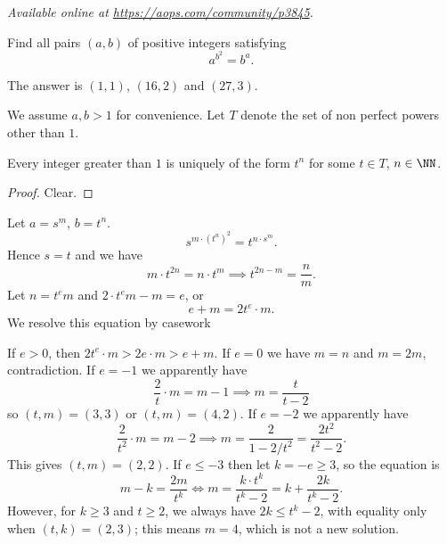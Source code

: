 \textsl{Available online at \url{https://aops.com/community/p3845}.}
\begin{mdframed}[style=mdpurplebox,frametitle={Problem statement}]
Find all pairs $(a,b)$ of positive integers satisfying
\[ a^{b^2} = b^a. \]
\end{mdframed}
The answer is $(1,1)$, $(16,2)$ and $(27,3)$.

We assume $a,b > 1$ for convenience.
Let $T$ denote the set of non perfect powers other than $1$.
\begin{claim*}
Every integer greater than $1$
is uniquely of the form $t^n$ for some $t \in T$, $n \in \NN$.
\end{claim*}
\begin{proof}
  Clear.
\end{proof}

Let $a = s^m$, $b = t^n$.
\[ s^{m \cdot (t^n)^2} = t^{n \cdot s^m}. \]
Hence $s = t$ and we have
\[ m \cdot t^{2n} = n \cdot t^m
  \implies t^{2n-m} = \frac nm. \]
Let $n = t^e m$ and $2 \cdot t^e m - m = e$, or
\[ e + m = 2t^e \cdot m. \]
We resolve this equation by casework
\begin{itemize}
  \ii If $e > 0$, then $2t^e \cdot m > 2e \cdot m > e+m$.
  \ii If $e=0$ we have $m=n$ and $m = 2m$, contradiction.
  \ii If $e = -1$ we apparently have
  \[ \frac{2}{t} \cdot m = m-1 \implies
    m = \frac{t}{t-2} \]
  so $(t,m) = (3,3)$ or $(t,m) = (4,2)$.
  \ii If $e = -2$ we apparently have
  \[ \frac{2}{t^2} \cdot m = m - 2
    \implies m = \frac{2}{1 - 2/t^2} = \frac{2t^2}{t^2-2}. \]
  This gives $(t,m) = (2,2)$.
  \ii If $e \le -3$ then let $k = -e \ge 3$, so the equation is
  \[ m-k = \frac{2m}{t^k}
  \iff m = \frac{k \cdot t^k}{t^k-2}
    = k + \frac{2k}{t^k-2}. \]
  However, for $k \ge 3$ and $t \ge 2$,
  we always have $2k \le t^k - 2$,
  with equality only when $(t,k) = (2,3)$;
  this means $m=4$, which is not a new solution.
\end{itemize}
\pagebreak